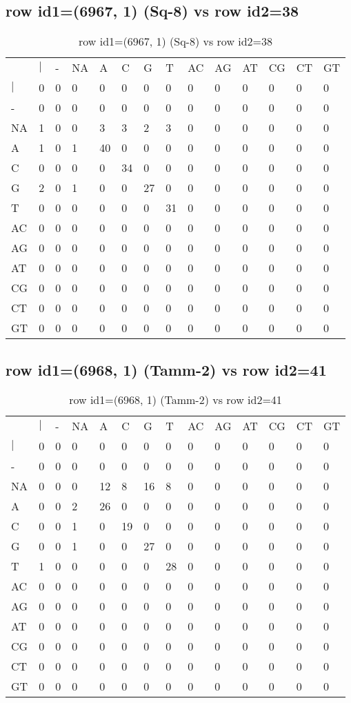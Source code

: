 \subsection{row id1=(6967, 1) (Sq-8) vs row id2=38}
\begin{center}
\begin{longtable}{|l|l|l|l|l|l|l|l|l|l|l|l|l|l|}
\caption{row id1=(6967, 1) (Sq-8) vs row id2=38} \label{table_dm182}\\
\hline
\\
\hline
&$|$&-&NA&A&C&G&T&AC&AG&AT&CG&CT&GT\\
$|$&0&0&0&0&0&0&0&0&0&0&0&0&0\\
-&0&0&0&0&0&0&0&0&0&0&0&0&0\\
NA&1&0&0&3&3&2&3&0&0&0&0&0&0\\
A&1&0&1&40&0&0&0&0&0&0&0&0&0\\
C&0&0&0&0&34&0&0&0&0&0&0&0&0\\
G&2&0&1&0&0&27&0&0&0&0&0&0&0\\
T&0&0&0&0&0&0&31&0&0&0&0&0&0\\
AC&0&0&0&0&0&0&0&0&0&0&0&0&0\\
AG&0&0&0&0&0&0&0&0&0&0&0&0&0\\
AT&0&0&0&0&0&0&0&0&0&0&0&0&0\\
CG&0&0&0&0&0&0&0&0&0&0&0&0&0\\
CT&0&0&0&0&0&0&0&0&0&0&0&0&0\\
GT&0&0&0&0&0&0&0&0&0&0&0&0&0\\
\hline
\end{longtable}
\end{center}

\subsection{row id1=(6968, 1) (Tamm-2) vs row id2=41}
\begin{center}
\begin{longtable}{|l|l|l|l|l|l|l|l|l|l|l|l|l|l|}
\caption{row id1=(6968, 1) (Tamm-2) vs row id2=41} \label{table_dm184}\\
\hline
\\
\hline
&$|$&-&NA&A&C&G&T&AC&AG&AT&CG&CT&GT\\
$|$&0&0&0&0&0&0&0&0&0&0&0&0&0\\
-&0&0&0&0&0&0&0&0&0&0&0&0&0\\
NA&0&0&0&12&8&16&8&0&0&0&0&0&0\\
A&0&0&2&26&0&0&0&0&0&0&0&0&0\\
C&0&0&1&0&19&0&0&0&0&0&0&0&0\\
G&0&0&1&0&0&27&0&0&0&0&0&0&0\\
T&1&0&0&0&0&0&28&0&0&0&0&0&0\\
AC&0&0&0&0&0&0&0&0&0&0&0&0&0\\
AG&0&0&0&0&0&0&0&0&0&0&0&0&0\\
AT&0&0&0&0&0&0&0&0&0&0&0&0&0\\
CG&0&0&0&0&0&0&0&0&0&0&0&0&0\\
CT&0&0&0&0&0&0&0&0&0&0&0&0&0\\
GT&0&0&0&0&0&0&0&0&0&0&0&0&0\\
\hline
\end{longtable}
\end{center}

